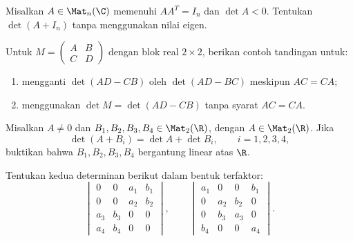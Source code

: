 \begin{latihan}\label{det:lat-ortogonal}
      Misalkan $A\in\Mat_n(\C)$ memenuhi $AA^T=I_n$ dan $\det A<0$.
      Tentukan $\det(A+I_n)$ tanpa menggunakan nilai eigen.
\end{latihan}

\begin{latihan}\label{det:lat-blok-syarat}
      Untuk $M=\left(\begin{smallmatrix}A&B\\C&D\end{smallmatrix}\right)$
      dengan blok real $2\times2$, berikan contoh tandingan untuk:
      \begin{enumerate}[label=(\alph*)]
            \item mengganti $\det(AD-CB)$ oleh $\det(AD-BC)$ meskipun $AC=CA$;
            \item menggunakan $\det M=\det(AD-CB)$ tanpa syarat $AC=CA$.
      \end{enumerate}
\end{latihan}

\begin{latihan}\label{det:lat-dependensi}
      Misalkan $A\ne0$ dan $B_1,B_2,B_3,B_4\in\Mat_2(\R)$, dengan
      $A\in\Mat_2(\R)$. Jika
      \[
            \det(A+B_i)=\det A+\det B_i,\qquad i=1,2,3,4,
      \]
      buktikan bahwa $B_1,B_2,B_3,B_4$ bergantung linear atas $\R$.
\end{latihan}

\begin{latihan}\label{det:lat-permutasiblok}
      Tentukan kedua determinan berikut dalam bentuk terfaktor:
      \[
            \begin{vmatrix}
                  0 & 0 & a_1 & b_1 \\0&0&a_2&b_2\\a_3&b_3&0&0\\a_4&b_4&0&0
            \end{vmatrix},\qquad
            \begin{vmatrix}
                  a_1 & 0 & 0 & b_1 \\0&a_2&b_2&0\\0&b_3&a_3&0\\b_4&0&0&a_4
            \end{vmatrix}.
      \]
\end{latihan}


